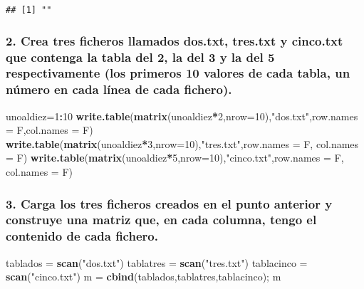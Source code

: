 \documentclass[]{article}
\newenvironment{Shaded}{\begin{snugshade}}{\end{snugshade}}
\newcommand{\KeywordTok}[1]{\textcolor[rgb]{0.13,0.29,0.53}{\textbf{#1}}}
\newcommand{\DataTypeTok}[1]{\textcolor[rgb]{0.13,0.29,0.53}{#1}}
\newcommand{\DecValTok}[1]{\textcolor[rgb]{0.00,0.00,0.81}{#1}}
\newcommand{\StringTok}[1]{\textcolor[rgb]{0.31,0.60,0.02}{#1}}
\newcommand{\OperatorTok}[1]{\textcolor[rgb]{0.81,0.36,0.00}{\textbf{#1}}}
\newcommand{\NormalTok}[1]{#1}
\begin{document}
\begin{verbatim}
## [1] ""
\end{verbatim}

\subsubsection{2. Crea tres ficheros llamados dos.txt, tres.txt y
cinco.txt que contenga la tabla del 2, la del 3 y la del 5
respectivamente (los primeros 10 valores de cada tabla, un número en
cada línea de cada
fichero).}\label{crea-tres-ficheros-llamados-dos.txt-tres.txt-y-cinco.txt-que-contenga-la-tabla-del-2-la-del-3-y-la-del-5-respectivamente-los-primeros-10-valores-de-cada-tabla-un-numero-en-cada-linea-de-cada-fichero.}

\begin{Shaded}
\begin{Highlighting}[]
\NormalTok{unoaldiez=}\DecValTok{1}\OperatorTok{:}\DecValTok{10}
\KeywordTok{write.table}\NormalTok{(}\KeywordTok{matrix}\NormalTok{(unoaldiez}\OperatorTok{*}\DecValTok{2}\NormalTok{,}\DataTypeTok{nrow=}\DecValTok{10}\NormalTok{),}\StringTok{"dos.txt"}\NormalTok{,}\DataTypeTok{row.names =}\NormalTok{ F,}\DataTypeTok{col.names =}\NormalTok{ F)}
\KeywordTok{write.table}\NormalTok{(}\KeywordTok{matrix}\NormalTok{(unoaldiez}\OperatorTok{*}\DecValTok{3}\NormalTok{,}\DataTypeTok{nrow=}\DecValTok{10}\NormalTok{),}\StringTok{"tres.txt"}\NormalTok{,}\DataTypeTok{row.names =}\NormalTok{ F, }\DataTypeTok{col.names =}\NormalTok{ F)}
\KeywordTok{write.table}\NormalTok{(}\KeywordTok{matrix}\NormalTok{(unoaldiez}\OperatorTok{*}\DecValTok{5}\NormalTok{,}\DataTypeTok{nrow=}\DecValTok{10}\NormalTok{),}\StringTok{"cinco.txt"}\NormalTok{,}\DataTypeTok{row.names =}\NormalTok{ F, }\DataTypeTok{col.names =}\NormalTok{ F)}
\end{Highlighting}
\end{Shaded}

\subsubsection{3. Carga los tres ficheros creados en el punto anterior y
construye una matriz que, en cada columna, tengo el contenido de cada
fichero.}\label{carga-los-tres-ficheros-creados-en-el-punto-anterior-y-construye-una-matriz-que-en-cada-columna-tengo-el-contenido-de-cada-fichero.}

\begin{Shaded}
\begin{Highlighting}[]
\NormalTok{tablados =}\StringTok{ }\KeywordTok{scan}\NormalTok{(}\StringTok{"dos.txt"}\NormalTok{)}
\NormalTok{tablatres =}\StringTok{ }\KeywordTok{scan}\NormalTok{(}\StringTok{"tres.txt"}\NormalTok{)}
\NormalTok{tablacinco =}\StringTok{ }\KeywordTok{scan}\NormalTok{(}\StringTok{"cinco.txt"}\NormalTok{)}
\NormalTok{m =}\StringTok{ }\KeywordTok{cbind}\NormalTok{(tablados,tablatres,tablacinco); m}
\end{Highlighting}
\end{Shaded}
\end{document}
